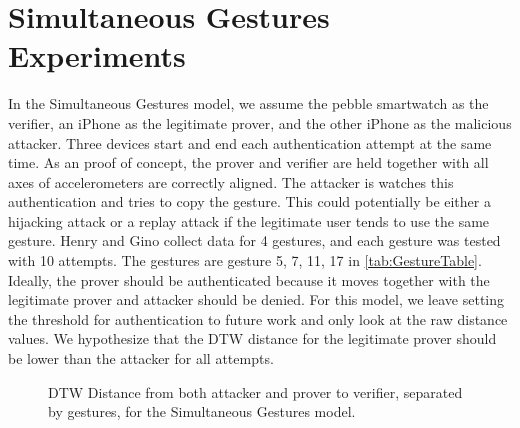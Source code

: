 


\section{Simultaneous Gestures \\ Experiments}
\label{sec:Simultaneous}
In the Simultaneous Gestures model, we assume the pebble smartwatch as the verifier, an iPhone as the legitimate prover, and the other iPhone as the malicious attacker. Three devices start and end each authentication attempt at the same time. As an proof of concept, the prover and verifier are held together with all axes of accelerometers are correctly aligned. The attacker is watches this authentication and tries to copy the gesture. This could potentially be either a hijacking attack or a replay attack if the legitimate user tends to use the same gesture. Henry and Gino collect data for 4 gestures, and each gesture was tested with 10 attempts. The gestures are gesture 5, 7, 11, 17 in \autoref{tab:GestureTable}. Ideally, the prover should be authenticated because it moves together with the legitimate prover and attacker should be denied. For this model, we leave setting the threshold for authentication to future work and only look at the raw distance values. We hypothesize that the \gls{DTW} distance for the legitimate prover should be lower than the attacker for all attempts.

 \begin{figure*}[!t]
    	\centering
 	\subfloat[Gesture \#5 ]{
 	\centering
 	\tikzquarter
		
 		 \label{fig:s5}}
 	\subfloat[Gesture \#7]{
 	\centering
 	\tikzquarter
		
 		 \label{fig:s7}}
 	\subfloat[Gesture \#11]{
 	\centering
 	\tikzquarter
		
 		 \label{fig:s11}}
	\subfloat[Gesture \#17]{
 	\centering
 	\tikzquarter
		
 		 \label{fig:s17}}
 	\caption{DTW Distance from both attacker and prover to verifier, separated by gestures, for the Simultaneous Gestures model.}
 	\label{fig:SimultaneousDistanceMatrixPlot}
 \end{figure*}


